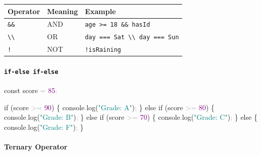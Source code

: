 \documentclass[
  justified,
  openright,
]{tufte-book}
\let\subsubsection\paragraph
\let\paragraph\paragraph
\newcommand{\BuiltInTok}[1]{#1}
\newcommand{\ControlFlowTok}[1]{\textcolor{BrandBlue}{#1}}
\newcommand{\DecValTok}[1]{\textcolor{Purple}{#1}}
\newcommand{\FunctionTok}[1]{\textcolor{BrandBlue}{#1}}
\newcommand{\KeywordTok}[1]{\textcolor{BrandBlue}{#1}}
\newcommand{\NormalTok}[1]{#1}
\newcommand{\OperatorTok}[1]{\textcolor{DarkGray}{#1}}
\newcommand{\StringTok}[1]{\textcolor{Teal}{#1}}
\newenvironment{Shaded}{%
  \begin{snugshade}
}{%
  \end{snugshade}
}
\let\subsubsection\paragraph
\let\paragraph\paragraph
\begin{document}
{\def\LTcaptype{none} %
\begin{longtable}[]{@{}lll@{}}
\toprule\noalign{}
Operator & Meaning & Example \\
\midrule\noalign{}
\endhead
\bottomrule\noalign{}
\endlastfoot
\texttt{\&\&} & AND & \texttt{age\ \textgreater{}=\ 18\ \&\&\ hasId} \\
\texttt{\textbackslash{}\textbar{}\textbackslash{}\textbar{}} & OR &
\texttt{day\ ===\ \textquotesingle{}Sat\textquotesingle{}\ \textbackslash{}\textbar{}\textbackslash{}\textbar{}\ day\ ===\ \textquotesingle{}Sun\textquotesingle{}} \\
\texttt{!} & NOT & \texttt{!isRaining} \\
\end{longtable}
}

\subsubsection{\texorpdfstring{\texttt{if-else\ if-else}}{if-else if-else}}\label{if-else-if-else}

\begin{Shaded}
\begin{Highlighting}[]
\KeywordTok{const}\NormalTok{ score }\OperatorTok{=} \DecValTok{85}\OperatorTok{;}

\ControlFlowTok{if}\NormalTok{ (score }\OperatorTok{\textgreater{}=} \DecValTok{90}\NormalTok{) \{}
  \BuiltInTok{console}\OperatorTok{.}\FunctionTok{log}\NormalTok{(}\StringTok{"Grade: A"}\NormalTok{)}\OperatorTok{;}
\NormalTok{\} }\ControlFlowTok{else} \ControlFlowTok{if}\NormalTok{ (score }\OperatorTok{\textgreater{}=} \DecValTok{80}\NormalTok{) \{}
  \BuiltInTok{console}\OperatorTok{.}\FunctionTok{log}\NormalTok{(}\StringTok{"Grade: B"}\NormalTok{)}\OperatorTok{;}
\NormalTok{\} }\ControlFlowTok{else} \ControlFlowTok{if}\NormalTok{ (score }\OperatorTok{\textgreater{}=} \DecValTok{70}\NormalTok{) \{}
  \BuiltInTok{console}\OperatorTok{.}\FunctionTok{log}\NormalTok{(}\StringTok{"Grade: C"}\NormalTok{)}\OperatorTok{;}
\NormalTok{\} }\ControlFlowTok{else}\NormalTok{ \{}
  \BuiltInTok{console}\OperatorTok{.}\FunctionTok{log}\NormalTok{(}\StringTok{"Grade: F"}\NormalTok{)}\OperatorTok{;}
\NormalTok{\}}
\end{Highlighting}
\end{Shaded}

\subsubsection{Ternary Operator}\label{ternary-operator}
\end{document}
